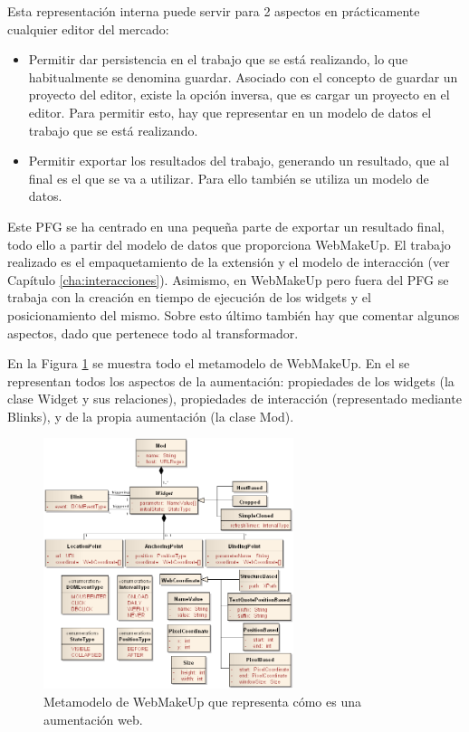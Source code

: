 Esta representación interna puede servir para 2 aspectos en prácticamente cualquier editor del mercado:
\begin{itemize}
\item{Permitir dar persistencia en el trabajo que se está realizando, lo que habitualmente se denomina guardar. Asociado con el concepto de guardar un proyecto del editor, existe la opción inversa, que es cargar un proyecto en el editor. Para permitir esto, hay que representar en un modelo de datos el trabajo que se está realizando.}
\item{Permitir exportar los resultados del trabajo, generando un resultado, que al final es el que se va a utilizar. Para ello también se utiliza un modelo de datos.}
\end{itemize}

Este PFG se ha centrado en una pequeña parte de exportar un resultado final, todo ello a partir del modelo de datos que proporciona WebMakeUp. El trabajo realizado es el empaquetamiento de la extensión y el modelo de interacción (ver Capítulo \ref{cha:interacciones}). Asimismo, en WebMakeUp pero fuera del PFG se trabaja con la creación en tiempo de ejecución de los widgets y el posicionamiento del mismo. Sobre esto último también hay que comentar algunos aspectos, dado que pertenece todo al transformador.

En la Figura \ref{fig:MetamodeloWebMakeUp} se muestra todo el metamodelo de WebMakeUp. En el se representan todos los aspectos de la aumentación: propiedades de los widgets (la clase Widget y sus relaciones), propiedades de interacción (representado mediante Blinks), y de la propia aumentación (la clase Mod).

\begin{figure}
\begin{center}
\includegraphics[width=0.65\textwidth]{figs/5-MetamodeloWebMakeUp.png}
\caption{Metamodelo de WebMakeUp que representa cómo es una aumentación web.}
\label{fig:MetamodeloWebMakeUp}
\end{center}
\end{figure}

